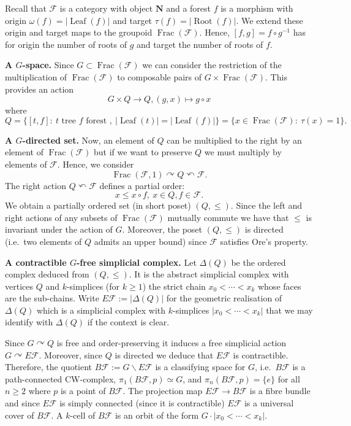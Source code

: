\documentclass[a4paper, 12pt]{amsart}
\numberwithin{equation}{section}
\theoremstyle{definition}
\newcommand{\act}{\curvearrowright}
\newcommand{\cF}{\mathcal F}
\DeclareMathOperator{\Frac}{Frac}
\DeclareMathOperator{\Leaf}{Leaf}
\newcommand{\N}{\mathbf{N}}
\DeclareMathOperator{\Root}{Root}
\begin{document}
Recall that $\cF$ is a category with object $\N$ and a forest $f$ is a morphism with origin $\omega(f)=|\Leaf(f)|$ and target $\tau(f)=|\Root(f)|$.
We extend these origin and target maps to the groupoid $\Frac(\cF)$.
Hence, $[f,g]=f\circ g^{-1}$ has for origin the number of roots of $g$ and target the number of roots of $f$.

{\bf A $G$-space.}
Since $G\subset \Frac(\cF)$ we can consider the restriction of the multiplication of $\Frac(\cF)$ to composable pairs of $G\times \Frac(\cF)$.
This provides an action 
$$G\times Q\to Q, (g,x)\mapsto g\circ x$$
where $$Q=\{[t,f]:\ t \text{ tree } f \text{ forest }, \ |\Leaf(t)|=|\Leaf(f)|\} = \{ x\in \Frac(\cF):\ \tau(x)=1\}.$$

{\bf A $G$-directed set.}
Now, an element of $Q$ can be multiplied to the right by an element of $\Frac(\cF)$ but if we want to preserve $Q$ we must multiply  by elements of $\cF$.
Hence, we consider
$$\Frac(\cF,1) \act Q \curvearrowleft \cF.$$
The right action $Q\curvearrowleft \cF$ defines a partial order:
$$x\leq x\circ f,\ x\in Q, f\in\cF.$$
We obtain a partially ordered set (in short poset) $(Q,\leq)$. 
Since the left and right actions of any subsets of $\Frac(\cF)$ mutually commute we have that $\leq$ is invariant under the action of $G$. 
Moreover, the poset $(Q,\leq)$ is directed (i.e.~two elements of $Q$ admits an upper bound) since $\cF$ satisfies Ore's property.

{\bf A contractible $G$-free simplicial complex.}
Let $\Delta(Q)$ be the ordered complex deduced from $(Q,\leq)$.
It is the abstract simplicial complex with vertices $Q$ and $k$-simplices (for $k\geq 1$) the strict chain $x_0<\cdots<x_k$ whose faces are the sub-chains.
Write $E\cF:=|\Delta(Q)|$ for the geometric realisation of $\Delta(Q)$ which is a simplicial complex with $k$-simplices $|x_0<\cdots<x_k|$ that we may identify with $\Delta(Q)$ if the context is clear.

Since $G\act Q$ is free and order-preserving it induces a free simplicial action $G\act E\cF$.
Moreover, since $Q$ is directed we deduce that $E\cF$ is contractible.
Therefore, the quotient $B\cF:= G\backslash E\cF$ is a classifying space for $G$, i.e.~$B\cF$ is a path-connected CW-complex, $\pi_1(B\cF,p)\simeq G$, and $\pi_n(B\cF,p)=\{e\}$ for all $n\geq 2$ where $p$ is a point of $B\cF$.
The projection map $E\cF\to B\cF$ is a fibre bundle and since $E\cF$ is simply connected (since it is contractible) $E\cF$ is a universal cover of $B\cF$.
A $k$-cell of $B\cF$ is an orbit of the form $G\cdot |x_0<\cdots<x_k|.$
\end{document}
